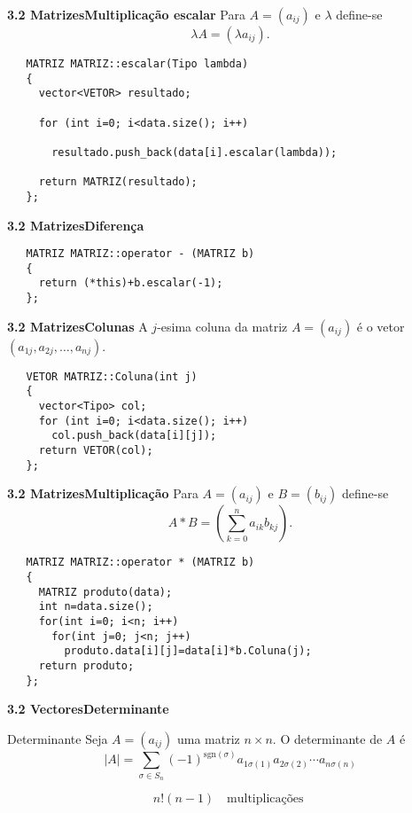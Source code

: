 \documentclass{beamer}
\begin{document}
\begin{frame}[fragile]{\bf 3.2 Matrizes}{\bf Multiplicação escalar}
Para $A=(a_{ij})$ e $\lambda$ define-se 
$$ \lambda A = (\lambda a_{ij}).$$
\lstset{language=C++}
\begin{lstlisting}
   MATRIZ MATRIZ::escalar(Tipo lambda) 
   {
     vector<VETOR> resultado;            

     for (int i=0; i<data.size(); i++)

       resultado.push_back(data[i].escalar(lambda));

     return MATRIZ(resultado);
   };
\end{lstlisting}
\end{frame}

\begin{frame}[fragile]{\bf 3.2 Matrizes}{\bf Diferença}

\lstset{language=C++}
\begin{lstlisting}
   MATRIZ MATRIZ::operator - (MATRIZ b)
   {
     return (*this)+b.escalar(-1);
   };
\end{lstlisting}
\end{frame}


\begin{frame}[fragile]{\bf 3.2 Matrizes}{\bf Colunas}
A $j$-esima coluna da matriz $A=(a_{ij})$ é o vetor $(a_{1j}, a_{2j}, \ldots, a_{nj})$.

\lstset{language=C++}
\begin{lstlisting}
   VETOR MATRIZ::Coluna(int j)
   {
     vector<Tipo> col;
     for (int i=0; i<data.size(); i++)
       col.push_back(data[i][j]);
     return VETOR(col);
   };
\end{lstlisting}
\end{frame}


\begin{frame}[fragile]{\bf 3.2 Matrizes}{\bf Multiplicação}
Para $A=(a_{ij})$ e $B=(b_{ij})$ define-se
$$ A*B = ( \sum_{k=0}^n a_{ik}b_{kj}).$$
\lstset{language=C++}
\begin{lstlisting}
   MATRIZ MATRIZ::operator * (MATRIZ b)
   {
     MATRIZ produto(data);
     int n=data.size();
     for(int i=0; i<n; i++)
       for(int j=0; j<n; j++)
         produto.data[i][j]=data[i]*b.Coluna(j);
     return produto;
   };
\end{lstlisting}
\end{frame}


\begin{frame}{\bf 3.2 Vectores}{\bf Determinante}
\begin{block}{Determinante}
Seja $A=(a_{ij})$ uma matriz $n \times n$. O determinante de $A$ é
$$ |A| = \sum_{\sigma \in S_n} (-1)^{\mathrm{sgn}(\sigma)} a_{1\sigma(1)}a_{2\sigma(2)}\cdots a_{n\sigma(n)}$$
\end{block}

$$ n!(n-1) \:\:\: \mbox{ multiplicações }$$
\end{frame}
\end{document}
